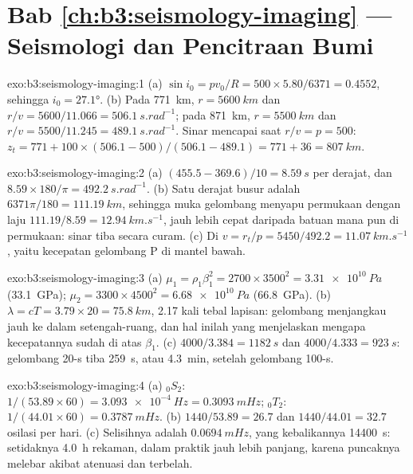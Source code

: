 \section*{Bab \ref{ch:b3:seismology-imaging} --- Seismologi dan Pencitraan Bumi}

\begin{solution}{exo:b3:seismology-imaging:1}
(a) $\sin i_0 = pv_0/R = 500\times5.80/6371 = 0.4552$, sehingga $i_0 = \ang{27.1}$.
(b) Pada \qty{771}{km}, $r = \qty{5600}{km}$ dan $r/v = 5600/11.066 =
\qty{506.1}{s.rad^{-1}}$; pada \qty{871}{km}, $r = \qty{5500}{km}$ dan $r/v =
5500/11.245 = \qty{489.1}{s.rad^{-1}}$. Sinar mencapai  saat $r/v = p = 500$:
$z_t = 771 + 100\times(506.1 - 500)/(506.1 - 489.1) = 771 + 36 =
\qty{807}{km}$.
\end{solution}

\begin{solution}{exo:b3:seismology-imaging:2}
(a) $(455.5 - 369.6)/10 = \qty{8.59}{s}$ per derajat, dan
$8.59\times180/\pi = \qty{492.2}{s.rad^{-1}}$. (b) Satu derajat busur adalah
$6371\pi/180 = \qty{111.19}{km}$, sehingga muka gelombang menyapu permukaan dengan laju
$111.19/8.59 = \qty{12.94}{km.s^{-1}}$, jauh lebih cepat daripada batuan mana pun di
permukaan: sinar tiba secara curam. (c) Di  $v = r_t/p =
5450/492.2 = \qty{11.07}{km.s^{-1}}$, yaitu kecepatan gelombang P di mantel bawah.
\end{solution}

\begin{solution}{exo:b3:seismology-imaging:3}
(a) $\mu_1 = \rho_1\beta_1^2 = 2700\times3500^2 = \qty{3.31e10}{Pa}$
(\qty{33.1}{GPa}); $\mu_2 = 3300\times4500^2 = \qty{6.68e10}{Pa}$
(\qty{66.8}{GPa}). (b) $\lambda = cT = 3.79\times20 = \qty{75.8}{km}$, 2.17
kali tebal lapisan: gelombang menjangkau jauh ke dalam setengah-ruang, dan hal inilah
yang menjelaskan mengapa kecepatannya sudah di atas $\beta_1$. (c) $4000/3.384 = \qty{1182}{s}$ dan
$4000/4.333 = \qty{923}{s}$: gelombang 20-s tiba \qty{259}{s}, atau
\qty{4.3}{min}, setelah gelombang 100-s.
\end{solution}

\begin{solution}{exo:b3:seismology-imaging:4}
(a) ${}_0S_2$: $1/(53.89\times60) = \qty{3.093e-4}{Hz} = \qty{0.3093}{mHz}$;
${}_0T_2$: $1/(44.01\times60) = \qty{0.3787}{mHz}$. (b) $1440/53.89 = 26.7$
dan $1440/44.01 = 32.7$ osilasi per hari. (c) Selisihnya adalah
$\qty{0.0694}{mHz}$, yang kebalikannya \qty{14400}{s}: setidaknya \qty{4.0}{h}
rekaman, dalam praktik jauh lebih panjang, karena puncaknya melebar akibat atenuasi dan
terbelah.
\end{solution}


